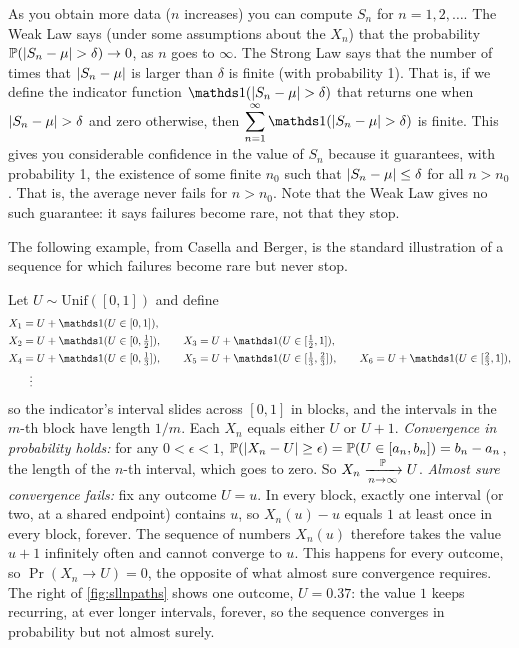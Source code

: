 As you obtain more data ($n$ increases) you can compute $S_n$ for $n=1,2,\ldots$.
The Weak Law says (under some assumptions about the $X_n$) that the probability $\mathbb{P}( \lvert S_n - \mu \rvert > \delta ) \to 0$, as $n$ goes to $\infty$.
The Strong Law says that the number of times that $\lvert S_n - \mu \rvert$ is larger than $\delta$ is finite (with probability 1).
That is, if we define the indicator function $\ind(\abs{S_n - \mu } > \delta )$ that returns one when $\lvert S_n - \mu \rvert > \delta$ and zero otherwise, then
$\ds \sum_{n=1}^{\infty} \ind(\abs{S_n - \mu } > \delta )$ is finite.
This gives you considerable confidence in the value of $S_n$ because it guarantees, with probability 1, the existence of some finite $n_0$ such that $\lvert S_n - \mu \rvert \leq \delta$ for all $n > n_0$.
That is, the average never fails for $n > n_0$.
Note that the Weak Law gives no such guarantee: it says failures become rare, not that they stop.

The following example, from Casella and Berger, is the standard illustration of a sequence for which failures become rare but never stop.

\begin{example}
\label{ex:sliding}
Let $U \sim \text{Unif}([0,1])$ and define
\begin{align*}
X_1 &= U + \ind(U \in [0, 1]), \\
X_2 &= U + \ind(U \in [0, \tfrac12]), \qquad X_3 = U + \ind(U \in [\tfrac12, 1]), \\
X_4 &= U + \ind(U \in [0, \tfrac13]), \qquad X_5 = U + \ind(U \in [\tfrac13, \tfrac23]), \qquad X_6 = U + \ind(U \in [\tfrac23, 1]), \\
&\ \ \vdots
\end{align*}
so the indicator's interval slides across $[0,1]$ in blocks, and the intervals in the $m$-th block have length $1/m$.
Each $X_n$ equals either $U$ or $U + 1$.
\textit{Convergence in probability holds:} for any $0 < \epsilon < 1$, $\mathbb{P}(\lvert X_n - U\rvert \geq \epsilon) = \mathbb{P}(U \in [a_n, b_n]) = b_n - a_n$, the length of the $n$-th interval, which goes to zero.
So $X_n \xrightarrow [n \to \infty ]{\mathbb{P}} U$.
\textit{Almost sure convergence fails:} fix any outcome $U = u$.
In every block, exactly one interval (or two, at a shared endpoint) contains $u$, so $X_n(u) - u$ equals $1$ at least once in every block, forever.
The sequence of numbers $X_n(u)$ therefore takes the value $u + 1$ infinitely often and cannot converge to $u$.
This happens for every outcome, so $\Pr(X_n \to U) = 0$, the opposite of what almost sure convergence requires.
The right of \cref{fig:sllnpaths} shows one outcome, $U = 0.37$: the value $1$ keeps recurring, at ever longer intervals, forever, so the sequence converges in probability but not almost surely.
\end{example}

